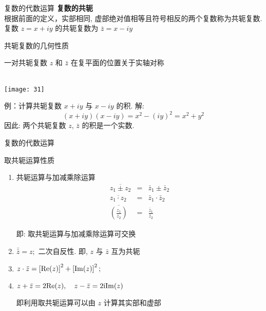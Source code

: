 \documentclass{beamer}
\begin{document}
\begin{frame}{复数的代数运算}
\textbf{复数的共轭}\\
根据前面的定义，实部相同, 虚部绝对值相等且符号相反的两个复数称为共轭复数.\\
 复数 $ z =x + iy $ 的共轭复数为 $ \bar{z} =x - i y $ 
\begin{block}{共轭复数的几何性质}
\begin{minipage}[b]{0.6\linewidth}
一对共轭复数 $ z $ 和 $ \bar{z} $ 在复平面的位置关于实轴对称\\\\
\end{minipage}\qquad
\begin{minipage}[t]{0.3\linewidth}
\texttt{[image: 31]}
\end{minipage}
\end{block}

\begin{exampleblock}{例：计算共轭复数 $ x+iy $ 与 $ x-iy $ 的积.}
解:
\[ (x+iy)(x-iy)=x^2-(iy)^2=x^2+y^2 \]
因此: 两个共轭复数 $ z $,  $ \bar{z} $  的积是一个实数.
\end{exampleblock}


\end{frame}




\begin{frame}{复数的代数运算}
\begin{block}{取共轭运算性质}
\begin{enumerate}[(1)]
	\item 共轭运算与加减乘除运算 
	\begin{eqnarray*}
	\overline {{z_1} \pm {z_2}} &=& {\bar z_1} \pm {\bar z_2} \\ \overline {{z_1} \cdot {z_2}} &=& {\bar z_1} \cdot {\bar z_2} \\
	 \overline {\left( {\frac{{{z_1}}}{{{z_2}}}} \right)} &=& \frac{{{{\bar z}_1}}}{{{{\bar z}_2}}}  
	\end{eqnarray*}
	
	即: 取共轭运算与加减乘除运算可交换
	
	\item 
	 $ \bar {\bar z }= z; $ 二次自反性. 即, $ z $ 与 $ \bar{z} $ 互为共轭
	\item 
	$ z \cdot \bar{z} = \left[ {\rm Re} (z) \right]^2 + \left[ {\rm Im} (z) \right]^2; $ 
	\item 
	$ z + \bar z = 2{\rm Re} (z), \quad z - \bar z = 2{\rm iIm} (z) $ 
	
	即利用取共轭运算可以由 $ z $ 计算其实部和虚部
	
\end{enumerate}
\end{block}
\end{frame}
\end{document}
